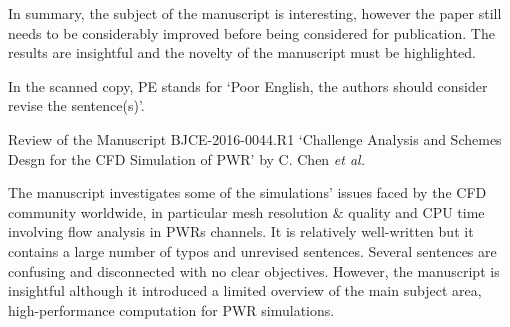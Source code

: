 \documentclass[14pt,twoside]{report}
\begin{document}
In summary, the subject of the manuscript is interesting, however the paper still needs to be considerably improved before being considered for publication. The results are insightful and the novelty of the manuscript must be highlighted. 

\medskip
In the scanned copy, PE stands for `Poor English, the authors should consider revise the sentence(s)'.
{
  } 


\clearpage


\begin{center}
  {\Large Review of the Manuscript BJCE-2016-0044.R1 `Challenge Analysis and Schemes Desgn for the CFD Simulation of PWR' by C. Chen {\it et al.}}
\end{center}

\medskip

The manuscript investigates some of the simulations' issues faced by the CFD community worldwide, in particular mesh resolution $\&$ quality and CPU time involving flow analysis in PWRs channels. It is relatively well-written but it contains a large number of typos and unrevised sentences. Several sentences are confusing and disconnected with no clear objectives.  However, the manuscript is insightful although it introduced a limited overview of the main subject area, high-performance computation for PWR simulations. 
\end{document}
